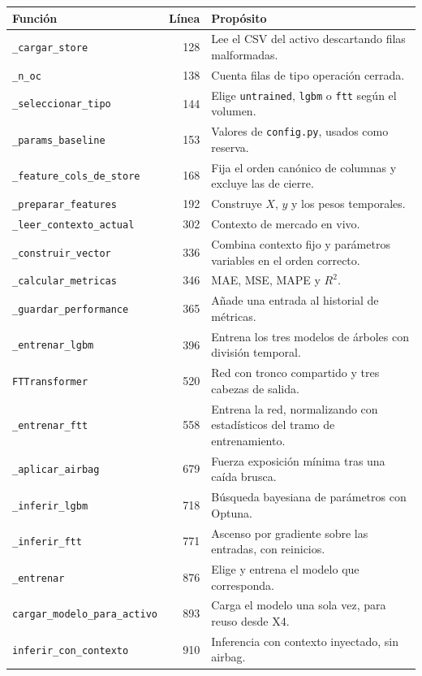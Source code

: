 \documentclass[11pt,a4paper]{article}
\newcommand{\code}[1]{\texttt{\small #1}}
\begin{document}
\begin{longtable}{@{}p{5.6cm} r p{\dimexpr\linewidth-7.7cm\relax}@{}}
\toprule
\textbf{Función} & \textbf{Línea} & \textbf{Propósito} \\
\midrule
\endhead
\code{_cargar_store} & 128 & Lee el CSV del activo descartando filas malformadas. \\
\code{_n_oc} & 138 & Cuenta filas de tipo operación cerrada. \\
\code{_seleccionar_tipo} & 144 & Elige \code{untrained}, \code{lgbm} o \code{ftt} según el volumen. \\
\code{_params_baseline} & 153 & Valores de \code{config.py}, usados como reserva. \\
\code{_feature_cols_de_store} & 168 & Fija el orden canónico de columnas y excluye las de cierre. \\
\code{_preparar_features} & 192 & Construye $X$, $y$ y los pesos temporales. \\
\code{_leer_contexto_actual} & 302 & Contexto de mercado en vivo. \\
\code{_construir_vector} & 336 & Combina contexto fijo y parámetros variables en el orden correcto. \\
\code{_calcular_metricas} & 346 & MAE, MSE, MAPE y $R^2$. \\
\code{_guardar_performance} & 365 & Añade una entrada al historial de métricas. \\
\code{_entrenar_lgbm} & 396 & Entrena los tres modelos de árboles con división temporal. \\
\code{FTTransformer} & 520 & Red con tronco compartido y tres cabezas de salida. \\
\code{_entrenar_ftt} & 558 & Entrena la red, normalizando con estadísticos del tramo de entrenamiento. \\
\code{_aplicar_airbag} & 679 & Fuerza exposición mínima tras una caída brusca. \\
\code{_inferir_lgbm} & 718 & Búsqueda bayesiana de parámetros con Optuna. \\
\code{_inferir_ftt} & 771 & Ascenso por gradiente sobre las entradas, con reinicios. \\
\code{_entrenar} & 876 & Elige y entrena el modelo que corresponda. \\
\code{cargar_modelo_para_activo} & 893 & Carga el modelo una sola vez, para reuso desde X4. \\
\code{inferir_con_contexto} & 910 & Inferencia con contexto inyectado, sin airbag. \\

\end{longtable}
\end{document}
